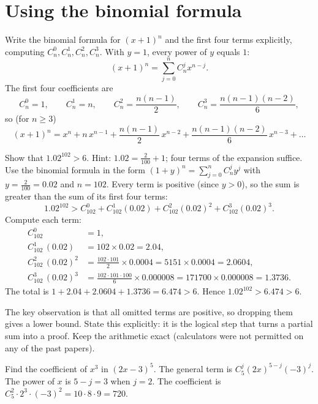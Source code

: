 \section{Using the binomial formula}\label{sec:binom-use}

\begin{example}
Write the binomial formula for $(x+1)^n$ and the first four terms explicitly, computing $C_n^0,C_n^1,C_n^2,C_n^3$.
\solution
With $y=1$, every power of $y$ equals $1$:
\[
(x+1)^n=\sum_{j=0}^{n}C_n^jx^{n-j}.
\]
The first four coefficients are
\[
C_n^0=1,\qquad C_n^1=n,\qquad C_n^2=\frac{n(n-1)}{2},\qquad C_n^3=\frac{n(n-1)(n-2)}{6},
\]
so (for $n\ge3$)
\[
(x+1)^n=x^n+n\,x^{n-1}+\frac{n(n-1)}{2}\,x^{n-2}+\frac{n(n-1)(n-2)}{6}\,x^{n-3}+\dots
\]
\end{example}

\begin{example}
Show that $1.02^{102}>6$. Hint: $1.02=\frac{2}{100}+1$; four terms of the expansion suffice. 
\solution
Use the binomial formula in the form $(1+y)^n=\sum_{j=0}^nC_n^jy^j$ with $y=\frac2{100}=0.02$ and $n=102$. Every term is
positive (since $y>0$), so the sum is greater than the sum of its first four terms:
\[
1.02^{102}>C_{102}^0+C_{102}^1(0.02)+C_{102}^2(0.02)^2+C_{102}^3(0.02)^3.
\]
Compute each term:
\begin{align*}
C_{102}^0&=1,\\
C_{102}^1\,(0.02)&=102\times0.02=2.04,\\
C_{102}^2\,(0.02)^2&=\frac{102\cdot101}{2}\times0.0004=5151\times0.0004=2.0604,\\
C_{102}^3\,(0.02)^3&=\frac{102\cdot101\cdot100}{6}\times0.000008=171700\times0.000008=1.3736.
\end{align*}
The total is $1+2.04+2.0604+1.3736=6.474>6$. Hence $1.02^{102}>6.474>6$.
\end{example}

\begin{examtip}
The key observation is that all omitted terms are positive, so dropping them gives a lower bound. State this explicitly:
it is the logical step that turns a partial sum into a proof. Keep the arithmetic exact (calculators were not permitted
on any of the past papers).
\end{examtip}

\begin{example}
Find the coefficient of $x^3$ in $(2x-3)^5$.
\solution
The general term is $C_5^j(2x)^{5-j}(-3)^j$. The power of $x$ is $5-j=3$ when $j=2$. The coefficient is
$C_5^2\cdot2^3\cdot(-3)^2=10\cdot8\cdot9=720$.
\end{example}

